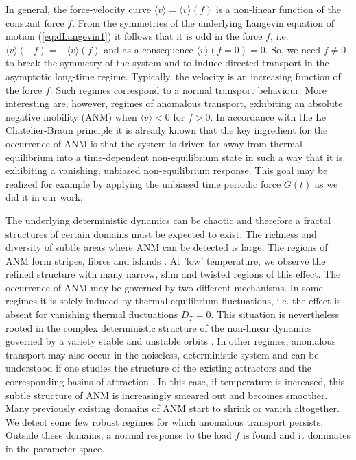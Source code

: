 \documentclass[12pt]{iopart}
\begin{document}
In general, the force-velocity curve $\langle v \rangle = \langle v \rangle(f)$  is a non-linear function of the constant force $f$. From the symmetries of the underlying Langevin equation of motion (\ref{eq:dLangevin1}) it follows that it is odd in the force  $f$, i.e. $\langle v \rangle(-f)=-\langle v \rangle(f)$ and as a consequence $\langle v \rangle(f=0)=0$. So, we need $f \ne 0$ to break the symmetry of the system and to induce directed transport in the asymptotic long-time regime. Typically, the velocity is an increasing function of the force $f$. Such regimes correspond to a normal transport behaviour. More interesting are, however, regimes of anomalous transport, exhibiting an absolute negative mobility (ANM) when $\langle v\rangle <0$ for $f>0$. In accordance with the Le Chatelier-Braun principle \cite{landau} it is already known that the key ingredient for the occurrence of ANM is that the system is driven far away from thermal equilibrium into a time-dependent non-equilibrium state in such a way that it is exhibiting a vanishing, unbiased non-equilibrium response. This goal may be realized for example by applying the unbiased time periodic force $G(t)$ as we did it in our work.

The underlying deterministic dynamics can be chaotic and
therefore a fractal structures of certain domains must be expected to exist. The richness and diversity of subtle areas where ANM can be detected is large. The regions of ANM form stripes, fibres and islands \cite{KosMac2008,ANMcolor,janus}.  At 'low' temperature, we observe the refined structure with many narrow, slim and twisted regions of this effect. The occurrence of ANM may be governed by two different mechanisms. In some regimes it is solely induced by thermal equilibrium fluctuations, i.e. the effect is absent for vanishing thermal fluctuations $D_T=0$. This situation is nevertheless rooted in
the complex deterministic structure of the non-linear dynamics
governed by a variety stable and unstable orbits \cite{MacKos2007}. In other regimes, anomalous transport may also occur in the noiseless, deterministic system and can be understood if one studies the structure of the existing attractors and the corresponding basins of attraction \cite{acta_jj}. In this case, if temperature is increased, this subtle structure of ANM is increasingly smeared out and becomes smoother. Many previously existing domains of ANM start to shrink or vanish altogether. We detect some few robust regimes for which anomalous transport persists. Outside these domains, a normal response to the load $f$ is found and it dominates in the parameter space.
\end{document}
